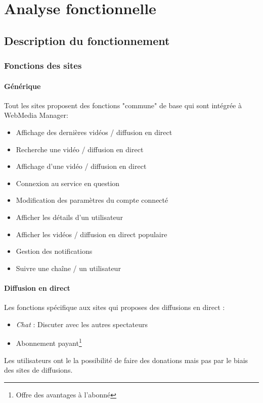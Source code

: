 \documentclass[11pt]{report} %
\begin{document}
		
\chapter{Analyse fonctionnelle}
	\section{Description du fonctionnement}
		\subsection{Fonctions des sites}
			\subsubsection{Générique}
			Tout les sites proposent des fonctions "commune" de base qui sont intégrée à WebMedia Manager:
			\begin{itemize}
				\item Affichage des dernières vidéos / diffusion en direct
				\item Recherche une vidéo / diffusion en direct
				\item Affichage d'une vidéo / diffusion en direct
				\item Connexion au service en question
				\item Modification des paramètres du compte connecté
				\item Afficher les détails d'un utilisateur
				\item Afficher les vidéos / diffusion en direct populaire
				\item Gestion des notifications
				\item Suivre une chaîne / un utilisateur
			\end{itemize}
			
			\subsubsection{Diffusion en direct}
			Les fonctions spécifique aux sites qui proposes des diffusions en direct :
			\begin{itemize}
				\item \textit{Chat} : Discuter avec les autres spectateurs
				\item Abonnement payant\footnote{Offre des avantages à l'abonné}
			\end{itemize}
			Les utilisateurs ont le la possibilité de faire des donations mais pas par le biais des sites de diffusions.
			
\end{document}
